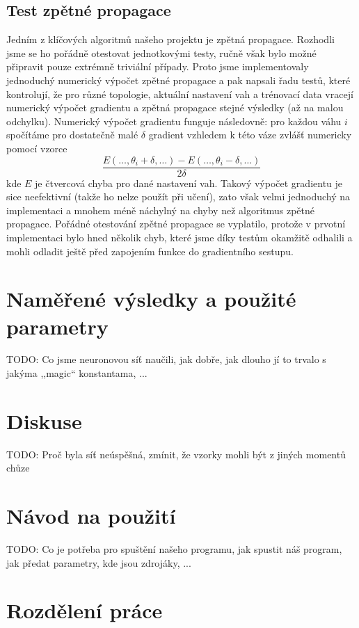 \documentclass[a4paper, 10pt]{article}
\begin{document}
\begin{multicols}{2}
    \subsection{Test zpětné propagace}
    Jedním z klíčových algoritmů našeho projektu je zpětná propagace.
    Rozhodli jsme se ho pořádně otestovat jednotkovými testy, ručně však bylo možné připravit pouze extrémně triviální případy.
    Proto jsme implementovaly jednoduchý numerický výpočet zpětné propagace a pak napsali řadu testů, které kontrolují, že pro různé topologie, aktuální nastavení vah a trénovací data vracejí numerický výpočet gradientu a zpětná propagace stejné výsledky (až na malou odchylku).
    Numerický výpočet gradientu funguje následovně: pro každou váhu $i$ spočítáme pro dostatečně malé $\delta$ gradient vzhledem k této váze zvlášť numericky pomocí vzorce
    $$\frac{E(\ldots, \theta_i + \delta, \ldots) - E(\ldots, \theta_i - \delta, \ldots)}{2\delta}$$
    kde $E$ je čtvercová chyba pro dané nastavení vah.
    Takový výpočet gradientu je sice neefektivní (takže ho nelze použít při učení), zato však velmi jednoduchý na implementaci a mnohem méně náchylný na chyby než algoritmus zpětné propagace.
    Pořádné otestování zpětné propagace se vyplatilo, protože v prvotní implementaci bylo hned několik chyb, které jsme díky testům okamžitě odhalili a mohli odladit ještě před zapojením funkce do gradientního sestupu.


  \end{multicols}
\section{Naměřené výsledky a použité parametry}
  \begin{multicols}{2}
  TODO: Co jsme neuronovou síť naučili, jak dobře, jak dlouho jí to trvalo s jakýma ,,magic`` konstantama, ...
  \end{multicols}
\section{Diskuse}
  \begin{multicols}{2}
    TODO: Proč byla síť neúspěšná, zmínit, že vzorky mohli být z jiných momentů chůze
  \end{multicols}
\appendix
\section{Návod na použití}
  TODO: Co je potřeba pro spuštění našeho programu, jak spustit náš program, jak předat parametry, kde jsou zdrojáky, ...
\section{Rozdělení práce}
\end{document}
